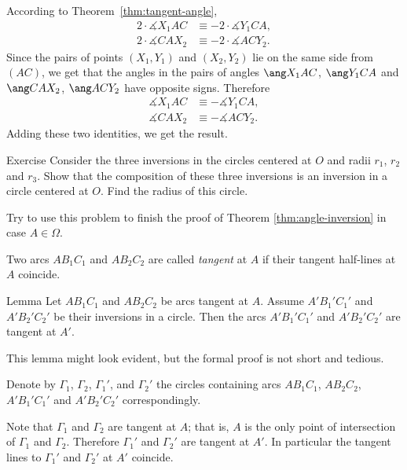{According to Theorem~\ref{thm:tangent-angle},
\begin{align*}
2\cdot \measuredangle X_1AC
&\equiv -2\cdot \measuredangle Y_1CA,
\\
2\cdot \measuredangle CAX_2
&\equiv -2\cdot \measuredangle ACY_2.
\end{align*}
Since the pairs of points $(X_1, Y_1)$ and $(X_2, Y_2)$
lie on the same side from $(AC)$,
we get that the  angles in the pairs of angles 
$\ang X_1AC$, $\ang Y_1CA$ 
and $\ang CAX_2$, $\ang ACY_2$
have opposite signs.
Therefore 
\begin{align*}
\measuredangle X_1AC
&\equiv - \measuredangle Y_1CA,
\\
 \measuredangle CAX_2
&\equiv - \measuredangle ACY_2.
\end{align*}
Adding these two identities, we get the result.
\qeds








\begin{thm}{Exercise}\label{ex:3-inverions}
Consider the three inversions
in the circles centered at $O$ and radii $r_1$, $r_2$ and $r_3$.
Show that the composition of these three inversions is an inversion in a circle centered at $O$.
Find the radius of this circle.

Try to use this problem to finish the proof of Theorem \ref{thm:angle-inversion} in case $A\in\Omega$.
\end{thm}







Two arcs $AB_1C_1$ and $AB_2C_2$ are called \emph{tangent} at $A$ if their tangent half-lines at $A$ coincide.

\begin{thm}{Lemma}\label{lem:tangent-to-tangent}
Let $AB_1C_1$ and $AB_2C_2$ be arcs tangent at $A$.
Assume $A'B_1'C_1'$ and $A'B_2'C_2'$ be their inversions in a circle.
Then the arcs $A'B_1'C_1'$ and $A'B_2'C_2'$ are tangent at $A'$.
\end{thm}

This lemma might look evident, 
but the formal proof is not short and tedious.

Denote by $\Gamma_1$, $\Gamma_2$, $\Gamma_1'$, and $\Gamma_2'$ the circles containing arcs $AB_1C_1$, $AB_2C_2$, $A'B_1'C_1'$ and $A'B_2'C_2'$ correspondingly.

Note that $\Gamma_1$ and $\Gamma_2$ are tangent at $A$; 
that is, $A$ is the only point of intersection of 
$\Gamma_1$ and $\Gamma_2$.
Therefore $\Gamma_1'$ and $\Gamma_2'$ are tangent at $A'$.
In particular the tangent lines to $\Gamma_1'$ and $\Gamma_2'$ at $A'$ coincide.

}
